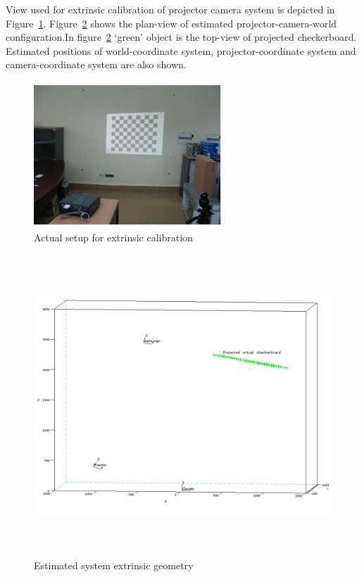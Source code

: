 \noindent  
View used for extrinsic calibration of projector camera system is depicted in Figure~\ref{fig:extrinsic_calib_setup}. Figure~\ref{fig:extrinsic_plot} shows the plan-view of estimated projector-camera-world configuration.In figure~\ref{fig:extrinsic_plot} `green' object is the top-view of projected checkerboard. Estimated positions of world-coordinate system, projector-coordinate system and camera-coordinate system are also shown.   
\begin{figure}[htbp]  
\centering  
\includegraphics[width=7cm,height=5.5cm]{../img_source/system_extrinsic.jpg}  
\caption{Actual setup for extrinsic calibration}  
\label{fig:extrinsic_calib_setup}
\end{figure}  
  
\begin{figure}[!htbp]  
\centering  
\includegraphics[width=17cm,height=11.3cm]{../img_source/system_plot_edit.jpg}  
\caption{Estimated system extrinsic geometry}  
\label{fig:extrinsic_plot}
\end{figure}  
\noindent  
 

